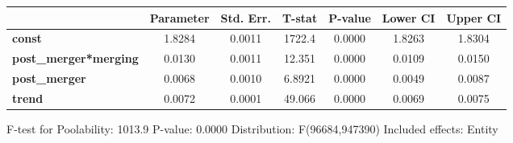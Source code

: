 \documentclass{report}a
\begin{document}
\begin{center}
\begin{tabular}{lcccccc}
                              & \textbf{Parameter} & \textbf{Std. Err.} & \textbf{T-stat} & \textbf{P-value} & \textbf{Lower CI} & \textbf{Upper CI}  \\
\midrule
\textbf{const}                &       1.8284       &       0.0011       &      1722.4     &      0.0000      &       1.8263      &       1.8304       \\
\textbf{post\_merger*merging} &       0.0130       &       0.0011       &      12.351     &      0.0000      &       0.0109      &       0.0150       \\
\textbf{post\_merger}         &       0.0068       &       0.0010       &      6.8921     &      0.0000      &       0.0049      &       0.0087       \\
\textbf{trend}                &       0.0072       &       0.0001       &      49.066     &      0.0000      &       0.0069      &       0.0075       \\
\bottomrule
\end{tabular}
\end{center}

F-test for Poolability: 1013.9 \newline
 P-value: 0.0000 \newline
 Distribution: F(96684,947390) \newline
  \newline
 Included effects: Entity
\end{document}
